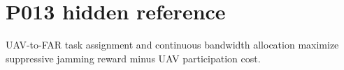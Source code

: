 \section*{P013 hidden reference}\nJoint UAV-to-FAR task assignment and continuous bandwidth allocation maximize suppressive jamming reward minus UAV participation cost.\n